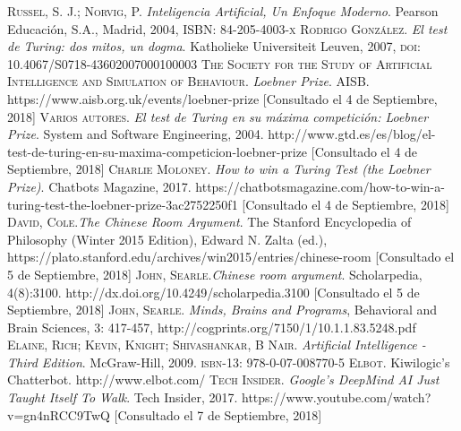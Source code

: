 \documentclass{article}
\begin{document}

\begin{thebibliography}{99}
	\newblock \textsc{Russel, S. J.; Norvig, P.} \textit{Inteligencia Artificial, Un Enfoque Moderno}. Pearson Educaci\'on, S.A., Madrid, 2004, \textsc{ISBN: 84-205-4003-x}
	 \textsc{Rodrigo Gonz\'alez}. \textit{El test de Turing: dos mitos, un dogma}. Katholieke Universiteit Leuven, 2007, \textsc{doi: 10.4067/S0718-43602007000100003}
	 \textsc{The Society for the Study of Artificial Intelligence and Simulation of Behaviour}. \textit{Loebner Prize}. AISB. https://www.aisb.org.uk/events/loebner-prize [Consultado el 4 de Septiembre, 2018]
	 \textsc{Varios autores}. \textit{El test de Turing en su m\'axima competici\'on: Loebner Prize}. System and Software Engineering, 2004. http://www.gtd.es/es/blog/el-test-de-turing-en-su-maxima-competicion-loebner-prize [Consultado el 4 de Septiembre, 2018]
	 \textsc{Charlie Moloney}. \textit{How to win a Turing Test (the Loebner Prize)}. Chatbots Magazine, 2017. https://chatbotsmagazine.com/how-to-win-a-turing-test-the-loebner-prize-3ac2752250f1 [Consultado el 4 de Septiembre, 2018]
	 \textsc{David, Cole}.\textit{The Chinese Room Argument}. The Stanford Encyclopedia of Philosophy (Winter 2015 Edition), Edward N. Zalta (ed.), https://plato.stanford.edu/archives/win2015/entries/chinese-room [Consultado el 5 de Septiembre, 2018]
	 \textsc{John, Searle}.\textit{Chinese room argument}. Scholarpedia, 4(8):3100. http://dx.doi.org/10.4249/scholarpedia.3100 [Consultado el 5 de Septiembre, 2018]
	 \textsc{John, Searle}. \textit{Minds, Brains and Programs}, Behavioral and Brain Sciences, 3: 417-457, http://cogprints.org/7150/1/10.1.1.83.5248.pdf
	 \textsc{Elaine, Rich; Kevin, Knight; Shivashankar, B Nair}. \textit{Artificial Intelligence - Third Edition}. McGraw-Hill, 2009. \textsc{isbn-13: 978-0-07-008770-5}
	\textsc{Elbot}.  Kiwilogic's Chatterbot. http://www.elbot.com/
	 \textsc{Tech Insider}. \textit{Google's DeepMind AI Just Taught Itself To Walk}. Tech Insider, 2017. https://www.youtube.com/watch?v=gn4nRCC9TwQ [Consultado el 7 de Septiembre, 2018]

\end{thebibliography}
\end{document}
